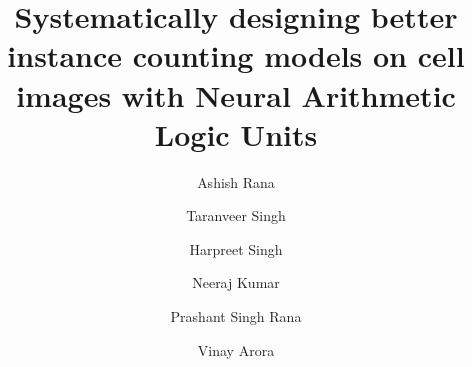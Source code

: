 \documentclass[runningheads]{llncs}
\begin{document}
%
\title{Systematically designing better instance counting models on cell images with Neural Arithmetic Logic Units}%
%
%
\author{
Ashish Rana \and %
Taranveer Singh  \and %
Harpreet Singh \and %
Neeraj Kumar \and
Prashant Singh Rana  \and
Vinay Arora 
}
%
%

%
\maketitle              %
%
\end{document}
